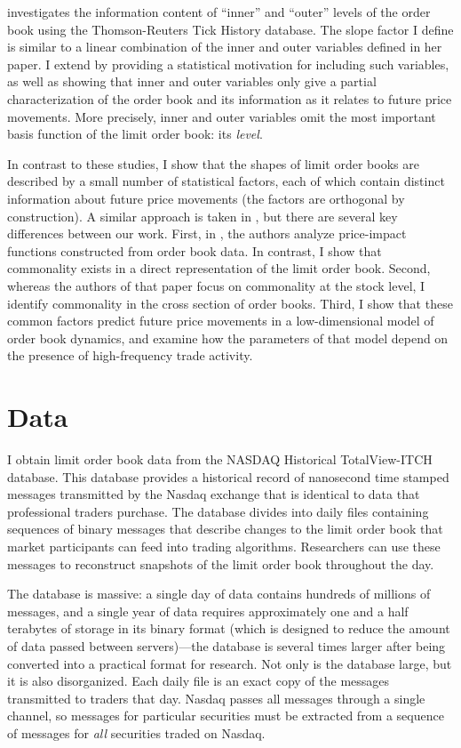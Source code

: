 		\citet{Yuferova2015} investigates the information content of ``inner'' and ``outer'' levels of the order book using the Thomson-Reuters Tick History database. The slope factor I define is similar to a linear combination of the inner and outer variables defined in her paper. I extend \citet{Yuferova2015} by providing a statistical motivation for including such variables, as well as showing that inner and outer variables only give a partial characterization of the order book and its information as it relates to future price movements. More precisely, inner and outer variables omit the most important basis function of the limit order book: its \textit{level}.

		In contrast to these studies, I show that the shapes of limit order books are described by a small number of statistical factors, each of which contain distinct information about future price movements (the factors are orthogonal by construction). A similar approach is taken in \citet{Beltran-Lopez2009}, but there are several key differences between our work. First, in \citet{Beltran-Lopez2009}, the authors analyze price-impact functions constructed from order book data. In contrast, I show that commonality exists in a direct representation of the limit order book. Second, whereas the authors of that paper focus on commonality at the stock level, I identify commonality in the cross section of order books. Third, I show that these common factors predict future price movements in a low-dimensional model of order book dynamics, and examine how the parameters of that model depend on the presence of high-frequency trade activity.


\section{Data}
	I obtain limit order book data from the NASDAQ Historical TotalView-ITCH database. This database provides a historical record of nanosecond time stamped messages transmitted by the Nasdaq exchange that is identical to data that professional traders purchase. The database divides into daily files containing sequences of binary messages that describe changes to the limit order book that market participants can feed into trading algorithms. Researchers can use these messages to reconstruct snapshots of the limit order book throughout the day.

	The database is massive: a single day of data contains hundreds of millions of messages, and a single year of data requires approximately one and a half terabytes of storage in its binary format (which is designed to reduce the amount of data passed between servers)---the database is several times larger after being converted into a practical format for research. Not only is the database large, but it is also disorganized. Each daily file is an exact copy of the messages transmitted to traders that day. Nasdaq passes all messages through a single channel, so messages for particular securities must be extracted from a sequence of messages for \textit{all} securities traded on Nasdaq.

